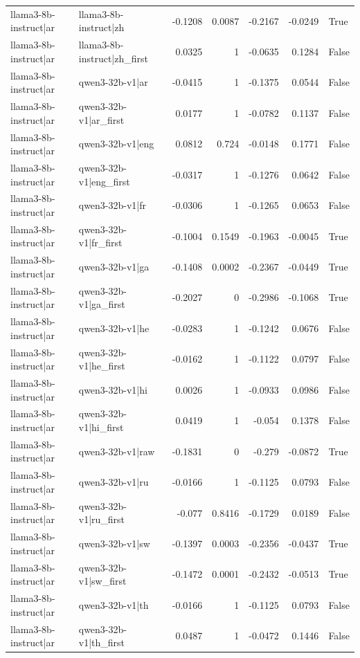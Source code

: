 \begin{table}
\begin{tabular}{l l r r r r l}
llama3-8b-instruct|ar & llama3-8b-instruct|zh & -0.1208 & 0.0087 & -0.2167 & -0.0249 & True \\
llama3-8b-instruct|ar & llama3-8b-instruct|zh_first & 0.0325 & 1 & -0.0635 & 0.1284 & False \\
llama3-8b-instruct|ar & qwen3-32b-v1|ar & -0.0415 & 1 & -0.1375 & 0.0544 & False \\
llama3-8b-instruct|ar & qwen3-32b-v1|ar_first & 0.0177 & 1 & -0.0782 & 0.1137 & False \\
llama3-8b-instruct|ar & qwen3-32b-v1|eng & 0.0812 & 0.724 & -0.0148 & 0.1771 & False \\
llama3-8b-instruct|ar & qwen3-32b-v1|eng_first & -0.0317 & 1 & -0.1276 & 0.0642 & False \\
llama3-8b-instruct|ar & qwen3-32b-v1|fr & -0.0306 & 1 & -0.1265 & 0.0653 & False \\
llama3-8b-instruct|ar & qwen3-32b-v1|fr_first & -0.1004 & 0.1549 & -0.1963 & -0.0045 & True \\
llama3-8b-instruct|ar & qwen3-32b-v1|ga & -0.1408 & 0.0002 & -0.2367 & -0.0449 & True \\
llama3-8b-instruct|ar & qwen3-32b-v1|ga_first & -0.2027 & 0 & -0.2986 & -0.1068 & True \\
llama3-8b-instruct|ar & qwen3-32b-v1|he & -0.0283 & 1 & -0.1242 & 0.0676 & False \\
llama3-8b-instruct|ar & qwen3-32b-v1|he_first & -0.0162 & 1 & -0.1122 & 0.0797 & False \\
llama3-8b-instruct|ar & qwen3-32b-v1|hi & 0.0026 & 1 & -0.0933 & 0.0986 & False \\
llama3-8b-instruct|ar & qwen3-32b-v1|hi_first & 0.0419 & 1 & -0.054 & 0.1378 & False \\
llama3-8b-instruct|ar & qwen3-32b-v1|raw & -0.1831 & 0 & -0.279 & -0.0872 & True \\
llama3-8b-instruct|ar & qwen3-32b-v1|ru & -0.0166 & 1 & -0.1125 & 0.0793 & False \\
llama3-8b-instruct|ar & qwen3-32b-v1|ru_first & -0.077 & 0.8416 & -0.1729 & 0.0189 & False \\
llama3-8b-instruct|ar & qwen3-32b-v1|sw & -0.1397 & 0.0003 & -0.2356 & -0.0437 & True \\
llama3-8b-instruct|ar & qwen3-32b-v1|sw_first & -0.1472 & 0.0001 & -0.2432 & -0.0513 & True \\
llama3-8b-instruct|ar & qwen3-32b-v1|th & -0.0166 & 1 & -0.1125 & 0.0793 & False \\
llama3-8b-instruct|ar & qwen3-32b-v1|th_first & 0.0487 & 1 & -0.0472 & 0.1446 & False \\

\end{tabular}
\end{table}
